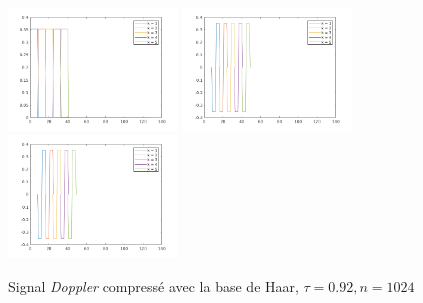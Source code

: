 \documentclass[a4paper,12pt, openany]{book}
\theoremstyle{break}
\begin{document}
\begin{figure}[H]
  \includegraphics[width=0.4\textwidth]{HaarMultipleScaleFather}\hfill
  \includegraphics[width=0.4\textwidth]{HaarMultipleScaleMother}\hfill
  \includegraphics[width=0.4\textwidth]{HaarMultipleScaleMother}\hfill
  \caption{Signal \textit{Doppler} compressé avec la base de Haar, $\tau=0.92, n=1024$}
\end{figure}

%
%
% 
% 


%
\end{document}
